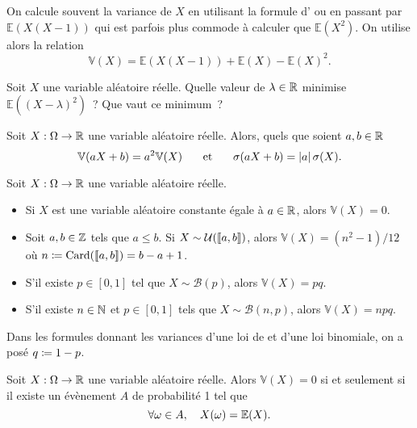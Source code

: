 \documentclass{magnolia}
\begin{document}
\begin{remarqueUnique}
\remarque On calcule souvent la variance de $X$ en utilisant la formule d'
  ou en passant par $\mathbb{E}(X(X-1))$ qui est parfois plus commode à calculer que
  $\mathbb{E}(X^2)$. On utilise alors la relation
  \[\mathbb{V}(X)=\mathbb{E}(X(X-1))+\mathbb{E}(X)-\mathbb{E}(X)^2.\]
\end{remarqueUnique}

\begin{exoUnique}
\exo Soit $X$ une variable aléatoire réelle. Quelle valeur de $\lambda\in\mathbb{R}$ minimise
  $\mathbb{E}((X-\lambda)^2)$~? Que vaut ce minimum~?
\end{exoUnique}

\begin{proposition}
Soit $X:\Omega\to\mathbb{R}$ une variable aléatoire réelle. Alors, quels que soient $a,b\in\mathbb{R}$
\[\mathbb{V}(aX+b)=a^2\mathbb{V}(X) \quad\quad\!\text{et}\quad\!\quad
  \sigma(aX+b)=\left|a\right|\sigma(X).\]
\end{proposition}

\begin{proposition}
Soit $X:\Omega\to\mathbb{R}$ une variable aléatoire réelle.
\begin{itemize}
\item Si $X$ est une variable aléatoire constante égale à $a\in\mathbb{R}$, alors $\mathbb{V}(X)=0$.
\item Soit $a,b\in\mathbb{Z}$ tels que $a\leq b$. Si $X\sim\mathcal{U}(\left\llbracket a,b\right\rrbracket)$,
  alors $\mathbb{V}(X)=(n^2-1)/12$ où $n\coloneqq\operatorname{Card}(\left\llbracket a,b\right\rrbracket)=b-a+1$.
\item S'il existe $p\in[0,1]$ tel que $X\sim\mathcal{B}(p)$, alors $\mathbb{V}(X)=pq$.
\item S'il existe $n\in\mathbb{N}$ et $p\in[0,1]$ tels que $X\sim\mathcal{B}(n, p)$, alors
  $\mathbb{V}(X)=npq$. 
\end{itemize}
\end{proposition}

\begin{remarqueUnique}
\remarque Dans les formules donnant les variances d'une loi de  et d'une loi binomiale,
  on a posé $q\coloneqq 1-p$.
\end{remarqueUnique}

\begin{proposition}
Soit $X:\Omega\to\mathbb{R}$ une variable aléatoire réelle. Alors $\mathbb{V}(X)=0$ si et seulement
si il existe un évènement $A$ de probabilité 1 tel que
\[\forall \omega\in A,\quad X(\omega)=\mathbb{E}(X).\]
\end{proposition}
\end{document}
